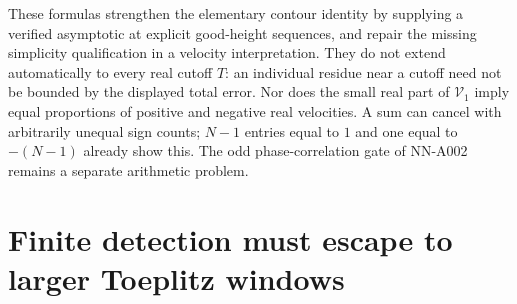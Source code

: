 These formulas strengthen the elementary contour identity by supplying a
verified asymptotic at explicit good-height sequences, and repair the
missing simplicity qualification in a velocity interpretation. They do
not extend automatically to every real cutoff $T$: an individual residue
near a cutoff need not be bounded by the displayed total error. Nor does
the small real part of $\mathcal V_1$ imply equal proportions of positive
and negative real velocities. A sum can cancel with arbitrarily unequal
sign counts; $N-1$ entries equal to $1$ and one equal to $-(N-1)$ already
show this. The odd phase-correlation gate of NN-A002 remains a separate
arithmetic problem.


\section{Finite detection must escape to larger Toeplitz windows}

